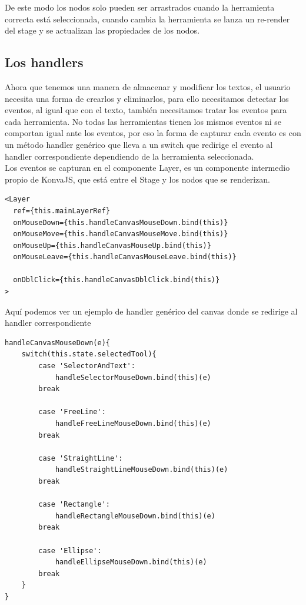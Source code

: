 De este modo los nodos solo pueden ser arrastrados cuando la herramienta correcta está
seleccionada, cuando cambia la herramienta se lanza un re-render del stage y se actualizan
las propiedades de los nodos.

\newpage
\subsection{Los handlers}

Ahora que tenemos una manera de almacenar y modificar los textos, 
el usuario necesita una forma de crearlos y eliminarlos, para ello necesitamos 
detectar los eventos, al igual que con el texto, también necesitamos tratar los eventos
para cada herramienta.
No todas las herramientas tienen los mismos eventos ni se comportan igual ante los eventos,
por eso la forma de capturar cada evento es con un método handler genérico que lleva a un 
switch que redirige el evento al handler correspondiente dependiendo de la herramienta seleccionada.
\\
Los eventos se capturan en el componente Layer, es un componente intermedio propio de KonvaJS\cite{KonvaJS},
que está entre el Stage y los nodos que se renderizan.

\begin{lstlisting}[caption={Enlazado de los handlers al componente layer que captura los eventos}]
<Layer
  ref={this.mainLayerRef}
  onMouseDown={this.handleCanvasMouseDown.bind(this)}
  onMouseMove={this.handleCanvasMouseMove.bind(this)}
  onMouseUp={this.handleCanvasMouseUp.bind(this)}
  onMouseLeave={this.handleCanvasMouseLeave.bind(this)}

  onDblClick={this.handleCanvasDblClick.bind(this)}
>
\end{lstlisting}

Aquí podemos ver un ejemplo de handler genérico del canvas donde se redirige al handler correspondiente

\begin{lstlisting}[caption={Sobrecarga del reescalado del nodo CvText}]
  handleCanvasMouseDown(e){
    switch(this.state.selectedTool){
        case 'SelectorAndText': 
            handleSelectorMouseDown.bind(this)(e)
        break

        case 'FreeLine':
            handleFreeLineMouseDown.bind(this)(e)
        break

        case 'StraightLine':
            handleStraightLineMouseDown.bind(this)(e)
        break

        case 'Rectangle':
            handleRectangleMouseDown.bind(this)(e)
        break

        case 'Ellipse':
            handleEllipseMouseDown.bind(this)(e)
        break
    }
}
\end{lstlisting}

